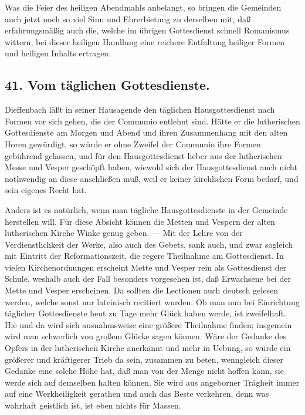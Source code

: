 Was die Feier des heiligen Abendmahls anbelangt, so bringen die Gemeinden auch jetzt noch so viel Sinn und Ehrerbietung zu derselben mit, daß erfahrungsmäßig auch die, welche im übrigen Gottesdienst schnell Romanismus wittern, bei dieser heiligen Handlung eine reichere Entfaltung heiliger Formen und heiligen Inhalts ertragen.

\subsection*{41. Vom täglichen Gottesdienste.}

Dieffenbach läßt in seiner Hausagende den täglichen Hausgottesdienst nach Formen vor sich gehen, die der Communio entlehnt sind. Hätte er die lutherischen Gottesdienste am Morgen und Abend und ihren Zusammenhang mit den alten Horen gewürdigt, so würde er ohne Zweifel der Communio ihre Formen gebührend gelassen, und für den Hausgottesdienst lieber aus der lutherischen Messe und Vesper geschöpft haben, wiewohl sich der Hausgottesdienst auch nicht
nothwendig an diese anschließen muß, weil er keiner kirchlichen Form bedarf, und sein eigenes Recht hat.

Anders ist es natürlich, wenn man tägliche Hausgottesdienste in der Gemeinde herstellen will. Für diese Absicht können die Metten und Vespern der alten lutherischen Kirche Winke genug geben. — Mit der Lehre von der Verdienstlichkeit der Werke, also auch des Gebets, sank auch, und zwar sogleich mit Eintritt der Reformationszeit, die regere Theilnahme am Gottesdienst. In vielen Kirchenordnungen erscheint Mette und Vesper rein als Gottesdienst der Schule, weshalb auch der Fall besonders vorgesehen ist, daß Erwachsene bei der Mette und Vesper erscheinen. Da sollten die Lectionen auch deutsch gelesen werden, welche sonst nur lateinisch recitiert wurden. Ob man nun bei Einrichtung täglicher Gottesdienste heut zu Tage mehr Glück haben werde, ist zweifelhaft. Hie und da wird sich ausnahmsweise eine größere Theilnahme finden; insgemein wird man schwerlich von großem Glücke sagen können. Wäre der Gedanke des Opfers in der lutherischen Kirche anerkannt und mehr in Uebung, so würde ein größerer und kräftigerer Trieb da sein, zusammen zu beten, wenngleich dieser Gedanke eine solche Höhe hat, daß man von der Menge nicht hoffen kann, sie werde sich auf demselben halten können. Sie wird aus angeborner Trägheit immer auf eine Werkheiligkeit gerathen und auch das Beste verkehren, denn was wahrhaft geistlich ist, ist eben nichts für Massen.

